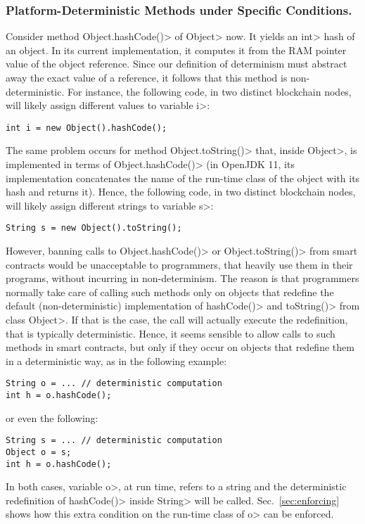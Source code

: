 \subsubsection*{Platform-Deterministic Methods under Specific Conditions.}
Consider method \<Object.hashCode()> of \<Object> now. It yields an \<int>
hash of an object. In its current implementation, it computes it from the
RAM pointer value of the object reference.
Since our definition of determinism must abstract away
the exact value of a reference, it follows that this method is non-deterministic.
For instance, the following code, in two distinct blockchain nodes,
will likely assign different values to variable \<i>:
%
\begin{verbatim}
int i = new Object().hashCode();
\end{verbatim}
%
The same problem occurs for method \<Object.toString()> that, inside
\<Object>, is implemented in terms of \<Object.hashCode()> (in OpenJDK 11, its
implementation concatenates
the name of the run-time class of the object with its hash and returns it).
Hence, the following code, in two distinct blockchain nodes,
will likely assign different strings to variable \<s>:
%
\begin{verbatim}
String s = new Object().toString();
\end{verbatim}
%
However, banning calls to \<Object.hashCode()> or \<Object.toString()>
from smart contracts would be unacceptable to programmers, that
heavily use them in their programs, without incurring in
non-determinism. The reason is that programmers normally
take care of calling such methods only on objects that redefine
the default (non-deterministic) implementation of
\<hashCode()> and \<toString()> from class \<Object>.
If that is the case, the call will actually
execute the redefinition, that is typically deterministic. Hence, it seems sensible
to allow calls to such methods in smart contracts, but only if they occur
on objects that redefine them in a deterministic way, as in the following example:
%
\begin{verbatim}
String o = ... // deterministic computation
int h = o.hashCode();
\end{verbatim}
%
or even the following:
%
\begin{verbatim}
String s = ... // deterministic computation
Object o = s;
int h = o.hashCode();
\end{verbatim}
%
In both cases, variable \<o>, at run time,
refers to a string and the deterministic redefinition of
\<hashCode()> inside \<String> will be called.
Sec.~\ref{sec:enforcing} shows how this extra condition on the run-time class of
\<o> can be enforced.

